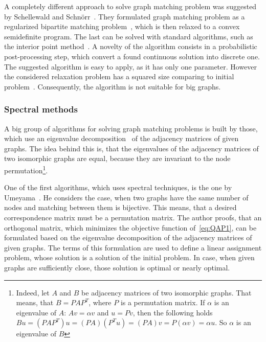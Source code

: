 A completely different approach to solve graph matching problem was suggested by Schellewald and Schn\"orr~\cite{Schellewald2005}. They formulated graph matching problem as a regularized bipartite matching problem~\cite{Diestel2000}, which is then relaxed to a convex semidefinite program. The last can be solved with standard algorithms, such as the interior point method~\cite{Book_ConvOpt}. A novelty of the algorithm consists in a probabilistic post-processing step, which convert a found continuous solution  into discrete one. The suggested algorithm is easy to apply, as it has only one parameter. However the considered relaxation problem has a squared size comparing to initial problem~\cite{Cour2006}. Consequently, the algorithm is not suitable for big graphs.
\subsubsection{Spectral methods}
A big group of algorithms for solving graph matching problems is built by those, which use an eigenvalue decomposition~\cite{Book_ConvOpt} of the adjacency matrices of given graphs. The idea behind this is, that the eigenvalues of the adjacency matrices of two isomorphic graphs are equal, because they are invariant to the node permutation\footnote{Indeed, let $A$ and $B$ be adjacency matrices of two isomorphic graphs. That means, that $B=PAP^T$, where $P$ is a permutation matrix. If $\alpha$ is an eigenvalue of $A$: $Av=\alpha v$ and $u=Pv$, then the following holds $Bu=(PAP^T)u=(PA)(P^Tu)=(PA)v=P(\alpha v)=\alpha u$. So $\alpha$ is an eigenvalue of $B$}.

One of the first algorithms, which uses spectral techniques, is the one by Umeyama\newline~\cite{Umeyam1988}. He considers the case, when two graphs have the same number of nodes and matching between them is bijective. This means, that a desired correspondence matrix must be a permutation matrix. The author proofs, that an orthogonal matrix, which minimizes the objective function of~\eqref{eq:QAP1}, can be formulated based on the eigenvalue decomposition of the adjacency matrices of given graphs. The terms of this formulation are used to define a linear assignment problem, whose solution is a solution of the initial problem. In case, when given graphs are sufficiently close, those solution is optimal or nearly optimal.

